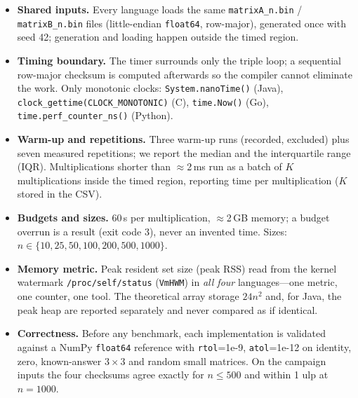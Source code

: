 \documentclass[11pt,a4paper]{article}
\begin{document}
\begin{itemize}
  \item \textbf{Shared inputs.} Every language loads the same
  \texttt{matrixA\_n.bin} / \texttt{matrixB\_n.bin} files (little-endian
  \texttt{float64}, row-major), generated once with seed 42; generation and
  loading happen outside the timed region.
  \item \textbf{Timing boundary.} The timer surrounds only the triple loop; a
  sequential row-major checksum is computed afterwards so the compiler cannot
  eliminate the work. Only monotonic clocks: \texttt{System.nanoTime()} (Java),
  \texttt{clock\_gettime(CLOCK\_MONOTONIC)} (C), \texttt{time.Now()} (Go),
  \texttt{time.perf\_counter\_ns()} (Python).
  \item \textbf{Warm-up and repetitions.} Three warm-up runs (recorded,
  excluded) plus seven measured repetitions; we report the median and the
  interquartile range (IQR). Multiplications shorter than \(\approx\)2\,ms run
  as a batch of \(K\) multiplications inside the timed region, reporting time
  per multiplication (\(K\) stored in the CSV).
  \item \textbf{Budgets and sizes.} 60\,s per multiplication,
  \(\approx\)2\,GB memory; a budget overrun is a result (exit code 3), never an
  invented time. Sizes: \(n \in \{10, 25, 50, 100, 200, 500, 1000\}\).
  \item \textbf{Memory metric.} Peak resident set size (peak RSS) read from the
  kernel watermark \texttt{/proc/self/status} (\texttt{VmHWM}) in \emph{all
  four} languages---one metric, one counter, one tool. The theoretical array
  storage \(24n^2\) and, for Java, the peak heap are reported separately and
  never compared as if identical.
  \item \textbf{Correctness.} Before any benchmark, each implementation is
  validated against a NumPy \texttt{float64} reference with
  \texttt{rtol}=1e-9, \texttt{atol}=1e-12 on identity, zero, known-answer
  \(3\times3\) and random small matrices. On the campaign inputs the four
  checksums agree exactly for \(n \le 500\) and within 1 ulp at \(n = 1000\).
\end{itemize}
\end{document}
